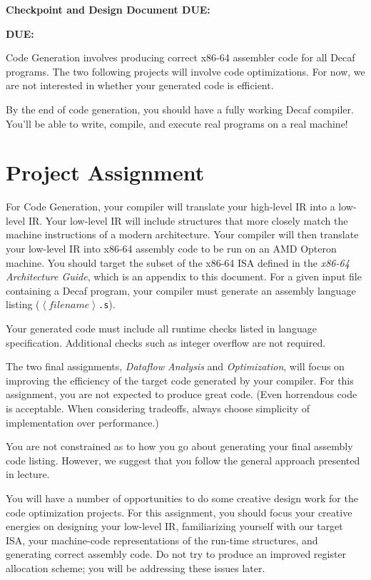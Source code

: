 


{\bf Checkpoint and Design Document DUE: \CODEGENDESIGNDUE}

{\bf DUE: \CODEGENDUE}

Code Generation involves producing correct x86-64 assembler code for
all Decaf programs.  The two following projects will involve code
optimizations.  For now, we are not interested in whether your
generated code is efficient.

By the end of code generation, you should have a fully working Decaf
compiler.  You'll be able to write, compile, and execute real
programs on a real machine!

\section*{Project Assignment}

For Code Generation, your compiler will translate your high-level IR
into a low-level IR.  Your low-level IR will include structures that
more closely match the machine instructions of a modern
architecture.  Your compiler will then translate your low-level IR
into x86-64 assembly code to be run on an AMD Opteron machine. You
should target the subset of the x86-64 ISA defined in the
\textit{x86-64 Architecture Guide}, which is an appendix to this
document. For a given input file containing a Decaf program, your
compiler must generate an assembly language listing
($\left<filename\right>$\/{\tt .s}\/).

Your generated code must include all runtime checks listed in
language specification.  Additional checks such as integer overflow are not
required.

The two final assignments, {\em Dataflow Analysis} and {\em
Optimization}, will focus on improving the efficiency of the target
code generated by your compiler. For this assignment, you are not
expected to produce great code.  (Even horrendous code is
acceptable.  When considering tradeoffs, always choose simplicity of
implementation over performance.)

You are not constrained as to how you go about generating your final
assembly code listing.  However, we suggest that you follow the
general approach presented in lecture.

You will have a number of opportunities to do some creative design
work for the code optimization projects.  For this assignment, you
should focus your creative energies on designing your low-level IR,
familiarizing yourself with our target ISA, your machine-code
representations of the run-time structures, and generating correct
assembly code.  Do not try to produce an improved register allocation
scheme; you will be addressing these issues later.


